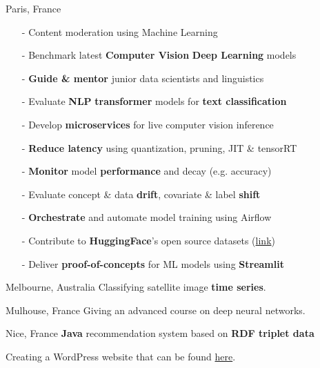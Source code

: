\documentclass[10pt,a4paper,ragged2e]{altacv}
\begin{document}
     {Paris, France}
\begin{itemize}
	\item[-]  Content moderation using Machine Learning
	\item[-] Benchmark latest \textbf{Computer Vision} \textbf{Deep Learning} models
	\item[-] \textbf{Guide \& mentor} junior data scientists and linguistics
	\item[-] Evaluate \textbf{NLP} \textbf{transformer} models for \textbf{text classification}  
	\item[-] Develop \textbf{microservices} for live computer vision inference 
	\item[-] \textbf{Reduce latency} using quantization, pruning, JIT \& tensorRT
	\item[-] \textbf{Monitor} model \textbf{performance} and decay (e.g. accuracy)
	\item[-] Evaluate concept \& data \textbf{drift}, covariate \& label \textbf{shift}
	\item[-] \textbf{Orchestrate} and automate model training using Airflow 
	\item[-] Contribute to \textbf{HuggingFace}'s open source datasets (\href{https://github.com/pulls?q=is%3Apr+author%3Ahfawaz+archived%3Afalse+is%3Aclosed+huggingface+is%3Amerged}{link})
	\item[-] Deliver \textbf{proof-of-concepts} for ML models using \textbf{Streamlit}
\end{itemize}

\divider


     {Melbourne, Australia}
{Classifying satellite image \textbf{time series}.}\\
\divider

     {Mulhouse, France}
{Giving an advanced course on  deep neural networks.}\\

\divider

     {Nice, France}
\textbf{Java} recommendation system based on \textbf{RDF triplet data}

\divider

{Creating a WordPress website that can be found \href{http://www.mradmcc.com/home/}{here}.}
\end{document}
